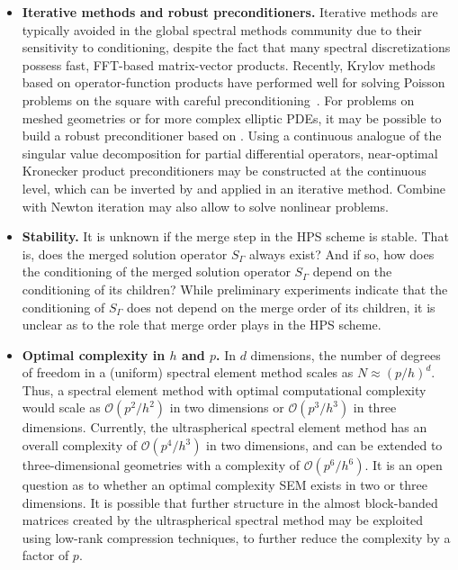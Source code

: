 \vspace{0.2em}
\begin{itemize}

\item \textbf{Iterative methods and robust preconditioners.} Iterative methods are typically avoided in the global spectral methods community due to their sensitivity to conditioning, despite the fact that many spectral discretizations possess fast, FFT-based matrix-vector products. Recently, Krylov methods based on operator-function products have performed well for solving Poisson problems on the square with careful preconditioning~\cite{Gilles_19_01}. For problems on meshed geometries or for more complex elliptic PDEs, it may be possible to build a robust preconditioner based on \ultraSEM. Using a continuous analogue of the singular value decomposition for partial differential operators, near-optimal Kronecker product preconditioners may be constructed at the continuous level, which can be inverted by \ultraSEM and applied in an iterative method. Combine \ultraSEM with Newton iteration may also allow \ultraSEM to solve nonlinear problems.

\item \textbf{Stability.} It is unknown if the merge step in the HPS scheme is stable. That is, does the merged solution operator $S_\Gamma$ always exist? And if so, how does the conditioning of the merged solution operator $S_\Gamma$ depend on the conditioning of its children? While preliminary experiments indicate that the conditioning of $S_\Gamma$ does not depend on the merge order of its children, it is unclear as to the role that merge order plays in the HPS scheme.

\item \textbf{Optimal complexity in $h$ and $p$.} In $d$ dimensions, the number of degrees of freedom in a (uniform) spectral element method scales as $N \approx (p/h)^d$. Thus, a spectral element method with optimal computational complexity would scale as $\mathcal{O}(p^2/h^2)$ in two dimensions or $\mathcal{O}(p^3/h^3)$ in three dimensions. Currently, the ultraspherical spectral element method has an overall complexity of $\mathcal{O}(p^4/h^3)$ in two dimensions, and can be extended to three-dimensional geometries with a complexity of $\mathcal{O}(p^6/h^6)$. It is an open question as to whether an optimal complexity SEM exists in two or three dimensions. It is possible that further structure in the almost block-banded matrices created by the ultraspherical spectral method may be exploited using low-rank compression techniques, to further reduce the complexity by a factor of $p$.


\end{itemize}
